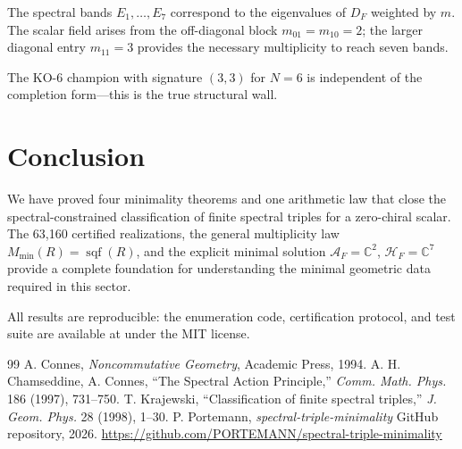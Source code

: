 \documentclass[11pt,a4paper]{article}
\theoremstyle{definition}
\begin{document}
The spectral bands $E_1,\dots,E_7$ correspond to the eigenvalues of $D_F$ weighted by $m$. The scalar field arises from the off-diagonal block $m_{01}=m_{10}=2$; the larger diagonal entry $m_{11}=3$ provides the necessary multiplicity to reach seven bands.

The KO-6 champion with signature $(3,3)$ for $N=6$ is independent of the completion form---this is the true structural wall.

\section{Conclusion}

We have proved four minimality theorems and one arithmetic law that close the spectral-constrained classification of finite spectral triples for a zero-chiral scalar. The 63,160 certified realizations, the general multiplicity law $M_{\min}(R) = \operatorname{sqf}(R)$, and the explicit minimal solution $\mathcal{A}_F = \mathbb{C}^2$, $\mathcal{H}_F = \mathbb{C}^7$ provide a complete foundation for understanding the minimal geometric data required in this sector.

All results are reproducible: the enumeration code, certification protocol, and test suite are available at \cite{portemann2027repo} under the MIT license.

\begin{thebibliography}{99}
 A. Connes, \textit{Noncommutative Geometry}, Academic Press, 1994.
 A. H. Chamseddine, A. Connes, ``The Spectral Action Principle,'' \textit{Comm. Math. Phys.} 186 (1997), 731--750.
 T. Krajewski, ``Classification of finite spectral triples,'' \textit{J. Geom. Phys.} 28 (1998), 1--30.
 P. Portemann, \textit{spectral-triple-minimality} GitHub repository, 2026. \url{https://github.com/PORTEMANN/spectral-triple-minimality}
\end{thebibliography}
\end{document}
